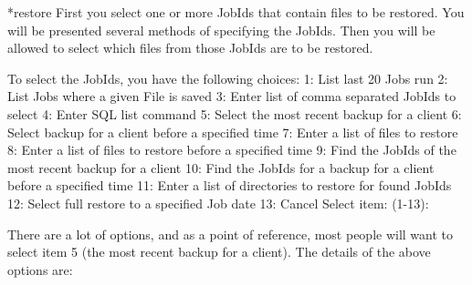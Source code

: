 \begin{bconsole}{*}{restore}{}{}
First you select one or more JobIds that contain files
to be restored. You will be presented several methods
of specifying the JobIds. Then you will be allowed to
select which files from those JobIds are to be restored.

To select the JobIds, you have the following choices:
     1: List last 20 Jobs run
     2: List Jobs where a given File is saved
     3: Enter list of comma separated JobIds to select
     4: Enter SQL list command
     5: Select the most recent backup for a client
     6: Select backup for a client before a specified time
     7: Enter a list of files to restore
     8: Enter a list of files to restore before a specified time
     9: Find the JobIds of the most recent backup for a client
    10: Find the JobIds for a backup for a client before a specified time
    11: Enter a list of directories to restore for found JobIds
    12: Select full restore to a specified Job date
    13: Cancel
Select item:  (1-13):
\end{bconsole}

There are a lot of options, and as a point of reference, most people will
want to select item 5 (the most recent backup for a client). The details
of the above options are:

